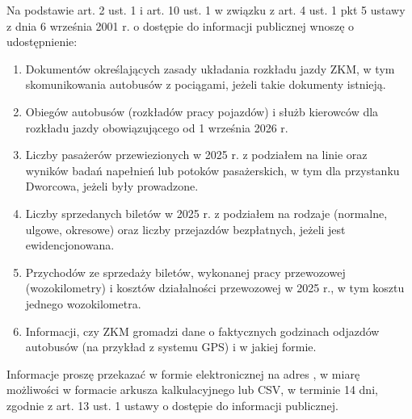 Na podstawie art. 2 ust. 1 i art. 10 ust. 1 w związku z art. 4 ust. 1 pkt 5 ustawy z dnia 6 września 2001 r. o dostępie do informacji publicznej wnoszę o udostępnienie:
\begin{enumerate}
\item Dokumentów określających zasady układania rozkładu jazdy ZKM, w tym skomunikowania autobusów z pociągami, jeżeli takie dokumenty istnieją.
\item Obiegów autobusów (rozkładów pracy pojazdów) i służb kierowców dla rozkładu jazdy obowiązującego od 1 września 2026 r.
\item Liczby pasażerów przewiezionych w 2025 r. z podziałem na linie oraz wyników badań napełnień lub potoków pasażerskich, w tym dla przystanku Dworcowa, jeżeli były prowadzone.
\item Liczby sprzedanych biletów w 2025 r. z podziałem na rodzaje (normalne, ulgowe, okresowe) oraz liczby przejazdów bezpłatnych, jeżeli jest ewidencjonowana.
\item Przychodów ze sprzedaży biletów, wykonanej pracy przewozowej (wozokilometry) i kosztów działalności przewozowej w 2025 r., w tym kosztu jednego wozokilometra.
\item Informacji, czy ZKM gromadzi dane o faktycznych godzinach odjazdów autobusów (na przykład z systemu GPS) i w jakiej formie.
\end{enumerate}

Informacje proszę przekazać w formie elektronicznej na adres \EmailNadawcy, w miarę możliwości w formacie arkusza kalkulacyjnego lub CSV, w terminie 14 dni, zgodnie z art. 13 ust. 1 ustawy o dostępie do informacji publicznej.

\Podpis

\MaterialyIZalaczniki

\Zalaczniki

